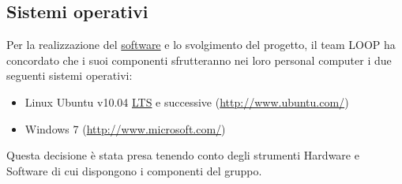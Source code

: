 \documentclass[a4paper,11pt]{article}
\begin{document}
\subsection{Sistemi operativi}
Per la realizzazione del \underline{software} e lo svolgimento del progetto, il team LOOP ha concordato che i suoi componenti sfrutteranno nei loro personal computer i due seguenti sistemi operativi:
\begin{itemize}
\item Linux Ubuntu v10.04 \underline{LTS} e successive (\url{http://www.ubuntu.com/})
\item Windows 7 (\url{http://www.microsoft.com/})
\end{itemize}
Questa decisione \`e stata presa tenendo conto degli strumenti Hardware e Software di cui dispongono i componenti del gruppo.
\newpage
\end{document}
